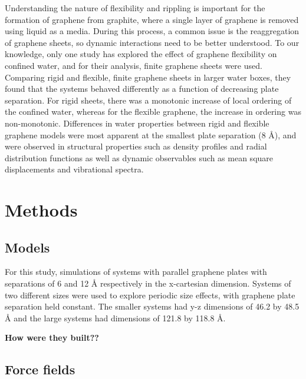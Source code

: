 \documentclass[12pt]{article}
\begin{document}
Understanding the nature of flexibility and rippling is important for the formation of graphene from graphite, where a single layer of graphene is removed using liquid as a media. During this process, a common issue is the reaggregation of graphene sheets, so dynamic interactions need to be better understood. To our knowledge, only one study \cite{Deshmukh2014} has explored the effect of graphene flexibility on confined water, and for their analysis, finite graphene sheets were used. Comparing rigid and flexible, finite graphene sheets in larger water boxes, they found that the systems behaved differently as a function of decreasing plate separation. For rigid sheets, there was a monotonic increase of local ordering of the confined water, whereas for the flexible graphene, the increase in ordering was non-monotonic. Differences  in water properties between rigid and flexible graphene models were most apparent at the smallest plate separation (8 \r A), and were observed in structural properties such as density profiles and radial distribution functions as well as dynamic observables such as mean square displacements and vibrational spectra. 


\clearpage

\section*{Methods}

\subsection*{Models}

For this study, simulations of systems with parallel graphene plates with
separations of 6 and 12 \r A respectively in the x-cartesian dimension.
Systems of two different sizes were used to explore periodic size effects, with graphene
plate separation held constant. The smaller systems had y-z dimensions of 46.2 by 48.5 \r A
and the large systems had dimensions of 121.8 by 118.8 \r A.

\textbf{\color{red} How were they built?? }

\subsection*{Force fields}
\end{document}
